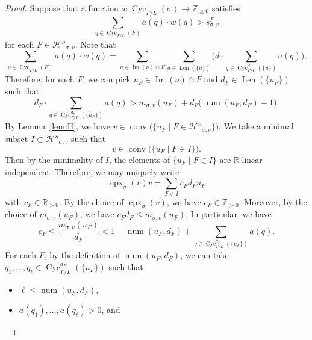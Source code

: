 \documentclass[11pt]{article}
\theoremstyle{definition}
\numberwithin{equation}{section}
\begin{document}
\begin{proof}
Suppose that a function $a: \operatorname{Cyc}_{\Gamma /L}(\sigma) \to \mathbb{Z}_{\ge 0}$ satisfies 
\[
\sum _{q \in \operatorname{Cyc}_{\Gamma /L}(F)} a(q) \cdot w(q) > s^{F} _{\sigma, v}
\]
for each $F \in \mathcal{H}'' _{\sigma, v}$. 
Note that 
\[
\sum _{q \in \operatorname{Cyc}_{\Gamma /L}(F)} a(q) \cdot w(q) = 
\sum_{u \in \operatorname{Im}(\nu) \cap F} 
\sum_{d \in \operatorname{Len} (\{ u \})}
\Biggl( d \cdot \sum _{q \in \operatorname{Cyc}_{\Gamma /L}^{d} (\{ u \})} a(q) \Biggr). 
\]
Therefore, for each $F$, we can pick $u_F \in \operatorname{Im}(\nu) \cap F$ and $d_F \in \operatorname{Len} (\{ u_F \})$ such that 
\[
d_F \cdot \sum _{q \in \operatorname{Cyc}_{\Gamma /L}^{d_F} (\{ u_F \})} a(q) 
> m_{\sigma, v}(u_F) + d_F \bigl( \operatorname{num}(u_F, d_F) -1 \bigr). 
\]
By Lemma~\ref{lem:H}, we have
$v \in \operatorname{conv}\bigl( \{ u_F \mid F \in \mathcal{H}'' _{\sigma, v} \} \bigr)$. 
We take a minimal subset $I \subset \mathcal{H}'' _{\sigma, v}$ such that 
\[
v \in \operatorname{conv}\bigl( \{ u_{F} \mid F \in I \} \bigr). 
\]
Then by the minimality of $I$, the elements of $\{ u_{F} \mid F \in I \}$ are $\mathbb{R}$-linear independent. 
Therefore, we may uniquely write 
\[
\operatorname{cpx}_{\sigma}(v) v = \sum_{F \in I} c_F d_F u_{F} 
\]
with $c_F \in \mathbb{R}_{> 0}$. 
By the choice of $\operatorname{cpx}_{\sigma}(v)$, we have $c_F \in \mathbb{Z}_{> 0}$. 
Moreover, by the choice of $m_{\sigma, v}(u_{F})$, we have $c_F d_F \le m_{\sigma, v}(u_{F})$. 
In particular, we have 
\[
c_F \le \frac{m_{\sigma, v}(u_{F})}{d_F} 
< 1 - \operatorname{num}(u_F, d_F) + \sum _{q \in \operatorname{Cyc}_{\Gamma /L}^{d_F} (\{ u_F \})} a(q). 
\]
For each $F$, by the definition of $\operatorname{num}(u_F, d_F)$, we can take $q_1, \ldots , q_{\ell} \in  \operatorname{Cyc}_{\Gamma /L}^{d_F} (\{ u_F \})$ such that
\begin{itemize}
\item 
$\ell \le \operatorname{num}(u_F, d_F)$, 

\item 
$a(q_1), \ldots, a(q_{\ell}) > 0$, and 


\end{itemize}
\end{proof}
\end{document}
